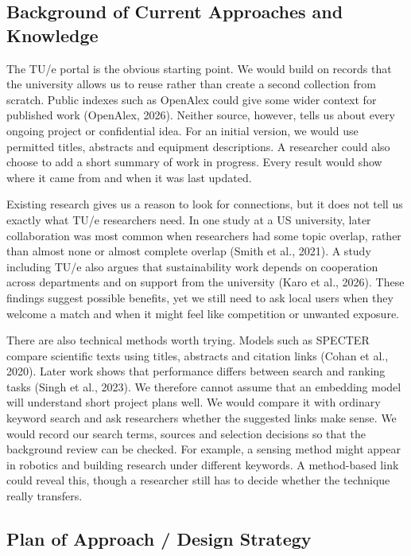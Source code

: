 \documentclass[11pt,a4paper]{article}
\begin{document}
\subsection*{Background of Current Approaches and Knowledge}

The TU/e portal is the obvious starting point. We would build on records that the university allows us to reuse rather than create a second collection from scratch. Public indexes such as OpenAlex could give some wider context for published work (OpenAlex, 2026). Neither source, however, tells us about every ongoing project or confidential idea. For an initial version, we would use permitted titles, abstracts and equipment descriptions. A researcher could also choose to add a short summary of work in progress. Every result would show where it came from and when it was last updated.

Existing research gives us a reason to look for connections, but it does not tell us exactly what TU/e researchers need. In one study at a US university, later collaboration was most common when researchers had some topic overlap, rather than almost none or almost complete overlap (Smith et al., 2021). A study including TU/e also argues that sustainability work depends on cooperation across departments and on support from the university (Karo et al., 2026). These findings suggest possible benefits, yet we still need to ask local users when they welcome a match and when it might feel like competition or unwanted exposure.

There are also technical methods worth trying. Models such as SPECTER compare scientific texts using titles, abstracts and citation links (Cohan et al., 2020). Later work shows that performance differs between search and ranking tasks (Singh et al., 2023). We therefore cannot assume that an embedding model will understand short project plans well. We would compare it with ordinary keyword search and ask researchers whether the suggested links make sense. We would record our search terms, sources and selection decisions so that the background review can be checked. For example, a sensing method might appear in robotics and building research under different keywords. A method-based link could reveal this, though a researcher still has to decide whether the technique really transfers.

\subsection*{Plan of Approach / Design Strategy}
\end{document}
